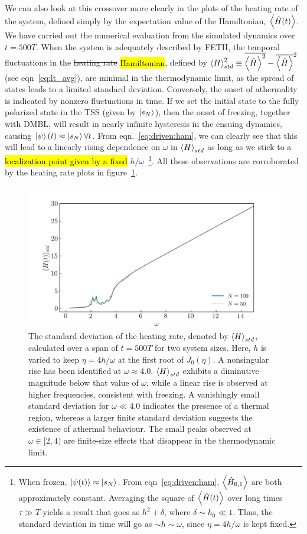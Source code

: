 \documentclass[%
reprint,
superscriptaddress,
linenumbers,
amsmath,amssymb,
aps,
prb,
showkeys,
]{revtex4-2}
\begin{document}
	We can also look at this crossover more clearly in the plots of the heating rate of the system, defined simply by the expectation value of the Hamiltonian, $\expval{\hat{H}(t)}$. We have carried out the numerical evaluation from the simulated dynamics over $t=500 T$. When the system is adequately described by FETH, the temporal fluctuations in the \st{heating rate} \hl{Hamiltonian}, defined by $\expval{H}^2_{std}\equiv \overline{\expval{\hat{H}}^2}-\overline{\expval{\hat{H}}}^2$ (see eqn~\ref{eq:lt_avg}), are minimal in the thermodynamic limit, as the spread of states leads to a limited standard deviation\cite{reimann_symmetry-prohibited_2021}. Conversely, the onset of athermality is indicated by nonzero fluctuations in time. If we set the initial state to the fully polarized state in the TSS (given by $\ket{s_N}$), then the 
	onset of freezing, together with DMBL, will result in nearly infinite hysteresis in the ensuing dynamics, causing $\ket{\psi}(t)\approx \ket{s_N} \forall t$. From eqn.~\ref{eq:driven:ham}, we can clearly see that this will lead to a linearly rising dependence on $\omega$ in $\expval{H}_{std}$ as long as we stick to a \hl{localization point given by a fixed} $h/\omega$~\footnote{When frozen, $\ket{\psi(t)}\approx \ket{s_N}$. From eqn~\ref{eq:driven:ham}, $\expval{\hat{H}_{0,1}}$ are both approximately constant. Averaging the square of $\expval{\hat{H}(t)}$ over long times $\tau\gg T$ yields a result that goes as $h^2 + \delta$, where $\delta\sim h_0\ll 1$. Thus, the standard deviation in time will go as $\sim h\sim \omega$, since $\eta=4h/\omega$ is kept fixed.}. All these observations are corroborated by the heating rate plots in figure~\ref{fig:havg_std}.	
	\begin{figure}[!ht]
		\centering
		\includegraphics[width = 9.cm]{hbar_avg_std.jpg}
		\caption{The standard deviation of the heating rate, denoted by $\expval{H}_{std}$, calculated over a span of $t=500 T$ for two system sizes. Here, $h$ is varied to keep $\eta = 4h/\omega$ at the first root of $J_0(\eta)$. A nonsingular rise has been identified at $\omega \approx 4.0$. $\expval{H}_{std}$ exhibits a diminutive magnitude below that value of $\omega$, while a linear rise is observed at higher frequencies, consistent with freezing. A vanishingly small standard deviation for $\omega \ll 4.0$ indicates the presence of a thermal region, whereas a larger finite standard deviation suggests the existence of athermal behaviour. The small peaks observed at $\omega\in [2, 4)$ are finite-size effects that disappear in the thermodynamic limit.}
		\label{fig:havg_std}
	\end{figure}
	
\end{document}
